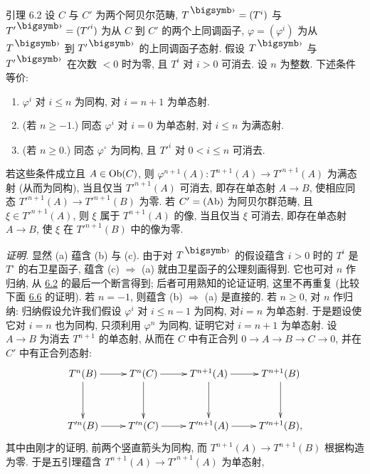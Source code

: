 \begin{enonce*}{引理 6.2}
设 $C$ 与 $C'$ 为两个阿贝尔范畴, $T^{\bigdot}=(T^{i})$ 与 $T'^{\bigdot}=({T'}^{i})$ 为从 $C$ 到 $C'$ 的两个上同调函子, $\varphi=(\varphi^{i})$ 为从 $T^{\bigdot}$ 到 $T'^{\bigdot}$ 的上同调函子\pageoriginale 态射. 假设 $T^{\bigdot}$ 与 $T'^{\bigdot}$ 在次数 $<0$ 时为零, 且 $T^{i}$ 对 $i>0$ 可消去. 设 $n$ 为整数. 下述条件等价:
\begin{enumerate}
\renewcommand{\theenumi}{\alph{enumi}}
\renewcommand{\labelenumi}{\theenumi)}
\item $\varphi^{i}$ 对 $i\leq n$ 为同构, 对 $i=n+1$ 为单态射.

\item (若 $n\geq -1$.) 同态 $\varphi^{i}$ 对 $i=0$ 为单态射, 对 $i\leq n$ 为满态射.

\item (若 $n\geq 0$.) 同态 $\varphi^{\circ}$ 为同构, 且 ${T'}^{i}$ 对 $0<i\leq n$ 可消去.
\end{enumerate}

若这些条件成立且 $A\in\operatorname{Ob}(C)$, 则 $\varphi^{n+1}(A):T^{n+1}(A)\to {T'}^{n+1}(A)$ 为满态射 (从而为同构), 当且仅当 ${T'}^{n+1}(A)$ 可消去, 即存在单态射 $A\to B$, 使相应同态 ${T'}^{n+1}(A)\to {T'}^{n+1}(B)$ 为零. 若 $C'=(\operatorname{Ab})$ 为阿贝尔群范畴, 且 $\xi\in {T'}^{n+1}(A)$, 则 $\xi$ 属于 $T^{n+1}(A)$ 的像, 当且仅当 $\xi$ 可消去, 即存在单态射 $A\to B$, 使 $\xi$ 在 ${T'}^{n+1}(B)$ 中的像为零.
\end{enonce*}

\noindent
\emph{证明.} 显然 (a) 蕴含 (b) 与 (c). 由于对 $T^{\bigdot}$ 的假设蕴含 $i>0$ 时的 $T^{i}$ 是 $T^{\circ}$ 的右卫星函子, 蕴含 (c) $\Rightarrow$ (a) 就由卫星函子的公理刻画得到. 它也可对 $n$ 作归纳, 从 \hyperref[XII.lem6.2]{6.2} 的最后一个断言得到; 后者可用熟知的论证证明, 这里不再重复 (比较下面 \hyperref[XII.cor6.6]{6.6} 的证明). 若 $n=-1$, 则蕴含 (b) $\Rightarrow$ (a) 是直接的. 若 $n\geq0$, 对 $n$ 作归纳: 归纳假设允许我们假设 $\varphi^{i}$ 对 $i\leq n-1$ 为同构, 对\pageoriginale $i=n$ 为单态射. 于是题设使它对 $i=n$ 也为同构, 只须利用 $\varphi^n$ 为同构, 证明它对 $i=n+1$ 为单态射. 设 $A\to B$ 为消去 $T^{n+1}$ 的单态射, 从而在 $C$ 中有正合列 $0\to A\to B\to C\to0$, 并在 $C'$ 中有正合列态射:
$$
\xymatrix@R=1.25cm{
T^{n}(B)  \ar[r] \ar[d]& T^{n}(C)  \ar[r]\ar[d] & T^{n+1}(A) \ar[d] \ar[r] & T^{n+1}(B)\ar[d]\\
T'^{n}(B)  \ar[r] & T'^{n}(C) \ar[r] & T'^{n+1}(A)  \ar[r] &
T'^{n+1}(B),
}
$$
其中由刚才的证明, 前两个竖直箭头为同构, 而 $T^{n+1}(A)\to T^{n+1}(B)$ 根据构造为零. 于是五引理蕴含 $T^{n+1}(A)\to {T'}^{n+1}(A)$ 为单态射, \cqfd

